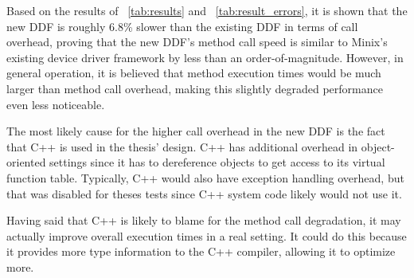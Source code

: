 Based on the results of \tablename~\ref{tab:results} and
\tablename~\ref{tab:result_errors}, it is shown that the new DDF
is roughly 6.8\% slower than the existing DDF in terms of call overhead,
proving that the new DDF's method call speed is similar to Minix's existing
device driver framework by less than an order-of-magnitude.  However, in
general operation, it is believed that method execution times would be much
larger than method call overhead, making this slightly degraded performance
even less noticeable.

The most likely cause for the higher call overhead in the new DDF is the fact
that C++ is used in the thesis' design.  C++ has additional overhead in
object-oriented settings since it has to dereference objects to get access
to its virtual function table.
Typically, C++ would also have exception handling overhead, but that was
disabled for theses tests since C++ system code likely would not use it.

Having said that C++ is likely to blame for the method call degradation, it
may actually improve overall execution times in a real setting.  It could
do this because it provides more type information to the C++ compiler,
allowing it to optimize more.
